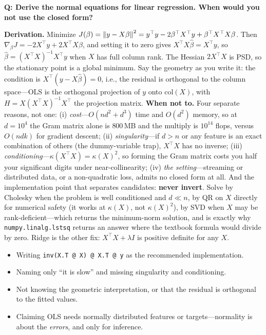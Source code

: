 \begin{interviewq}
\textbf{Q: Derive the normal equations for linear regression. When would you not use the closed form?}

 \quad {} \quad \badgefreq{\freqhigh}

\stronganswer

\textbf{Derivation.} Minimize $J(\beta)=\left\lVert y-X\beta\right\rVert^2 = y^{\top}y - 2\beta^{\top}X^{\top}y + \beta^{\top}X^{\top}X\beta$. Then $\nabla_\beta J = -2X^{\top}y + 2X^{\top}X\beta$, and setting it to zero gives $X^{\top}X\hat\beta = X^{\top}y$, so $\hat\beta = (X^{\top}X)^{-1}X^{\top}y$ when $X$ has full column rank. The Hessian $2X^{\top}X$ is PSD, so the stationary point is a global minimum. Say the geometry as you write it: the condition is $X^{\top}(y-X\hat\beta)=0$, i.e., the residual is orthogonal to the column space---OLS is the orthogonal projection of $y$ onto $\mathrm{col}(X)$, with $H = X(X^{\top}X)^{-1}X^{\top}$ the projection matrix. \textbf{When not to.} Four separate reasons, not one: (i) \emph{cost}---$O(nd^2 + d^3)$ time and $O(d^2)$ memory, so at $d=10^4$ the Gram matrix alone is $800$\,MB and the multiply is $10^{14}$ flops, versus $O(ndk)$ for gradient descent; (ii) \emph{singularity}---if $d>n$ or any feature is an exact combination of others (the dummy-variable trap), $X^{\top}X$ has no inverse; (iii) \emph{conditioning}---$\kappa(X^{\top}X)=\kappa(X)^2$, so forming the Gram matrix costs you half your significant digits under near-collinearity; (iv) \emph{the setting}---streaming or distributed data, or a non-quadratic loss, admits no closed form at all. And the implementation point that separates candidates: \textbf{never invert}. Solve by Cholesky when the problem is well conditioned and $d\ll n$, by QR on $X$ directly for numerical safety (it works at $\kappa(X)$, not $\kappa(X)^2$), by SVD when $X$ may be rank-deficient---which returns the minimum-norm solution, and is exactly why \texttt{numpy.linalg.lstsq} returns an answer where the textbook formula would divide by zero. Ridge is the other fix: $X^{\top}X + \lambda I$ is positive definite for any $X$.

\redflags
\begin{itemize}
    \item Writing \texttt{inv(X.T @ X) @ X.T @ y} as the recommended implementation.
    \item Naming only ``it is slow'' and missing singularity and conditioning.
    \item Not knowing the geometric interpretation, or that the residual is orthogonal to the fitted values.
    \item Claiming OLS needs normally distributed features or targets---normality is about the \emph{errors}, and only for inference.
\end{itemize}


\end{interviewq}
